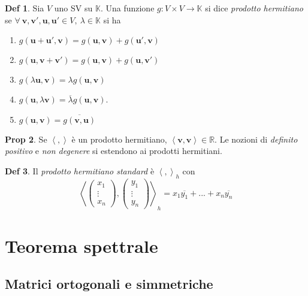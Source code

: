 \documentclass[]{article}
\newcommand{\vu}{\mathbf{u}}
\newcommand{\vv}{\mathbf{v}}
\newcommand{\scalprod}[2]{\left\langle #1 , #2 \right\rangle}
\theoremstyle{definition}
\theoremstyle{definition}
\newtheorem{prop}{Prop}[subsection]
\theoremstyle{definition}
\newtheorem{dfn}[prop]{Def}
\begin{document}
\begin{dfn} Sia $V$ uno SV su $\mathbb{K}$. Una funzione $g:V \times V \to \mathbb{K}$ si dice \emph{prodotto hermitiano} se $\forall \ \vv , \vv ' , \vu , \vu ' \in V ,\ \lambda \in \mathbb{K}$ si ha
\begin{enumerate}
	\item $g(\vu + \vu ', \vv) = g(\vu, \vv) + g(\vu ', \vv)$
	\item $g(\vu, \vv + \vv ') = g(\vu, \vv) + g(\vu, \vv ')$
	\item $g(\lambda \vu, \vv) = \lambda g(\vu, \vv)$
	\item $g(\vu, \lambda \vv) = \overline{\lambda} g(\vu, \vv)$.
	\item $g(\vu  ,\vv ) = \overline{g(\vv , \vu )}$
\end{enumerate}

\end{dfn} \begin{prop} Se $\scalprod{}{}$ è un prodotto hermitiano, $\scalprod{\vv}{\vv} \in \mathbb{R}$. Le nozioni di \emph{definito positivo} e \emph{non degenere} si estendono ai prodotti hermitiani. 

\end{prop} \begin{dfn} Il \emph{prodotto hermitiano standard} è $\scalprod{}{} _h$ con $$\scalprod{\begin{pmatrix} x_1 \\ \vdots \\ x_n \end{pmatrix}}{\begin{pmatrix} y_1 \\ \vdots \\ y_n \end{pmatrix}}_h =x_1 \overline{y_1} + ... + x_n \overline{y_n}$$
\end{dfn}

\section{Teorema spettrale} 
\subsection{Matrici ortogonali e simmetriche} 
\end{document}
